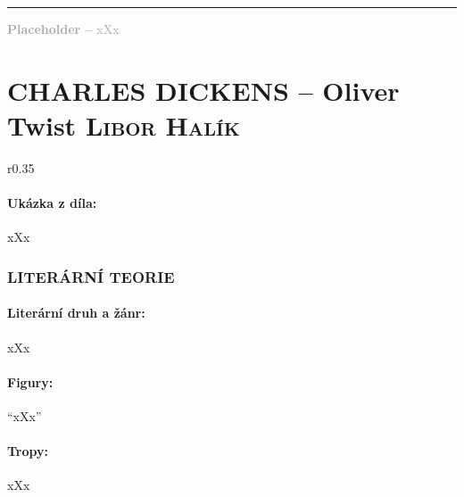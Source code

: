 \documentclass[A4paper]{extarticle} %
\begin{document}
\vfill

\noindent\begin{minipage}{\textwidth}
    \textcolor{darkgray}{\rule{\linewidth}{0.4pt}
    \footnotesize
    \textbf{Placeholder --} xXx
    }
\end{minipage}

\newpage


\changefontsize{8pt}

\part*{CHARLES DICKENS -- Oliver Twist {\hfill \normalfont\tiny\textsc{Libor Halík}}}

\noindent\begin{wrapfigure}{r}{0.35\textwidth}
\tiny

\subsection*{Ukázka z díla:}
\setlength{\parindent}{3pt}
xXx
\end{wrapfigure}

\section*{LITERÁRNÍ TEORIE}

\subsection*{Literární druh a žánr:}
\noindent xXx



\subsection*{Figury:}
\noindent 
\enquote{xXx}

\subsection*{Tropy:}
\noindent 
xXx
\end{document}
